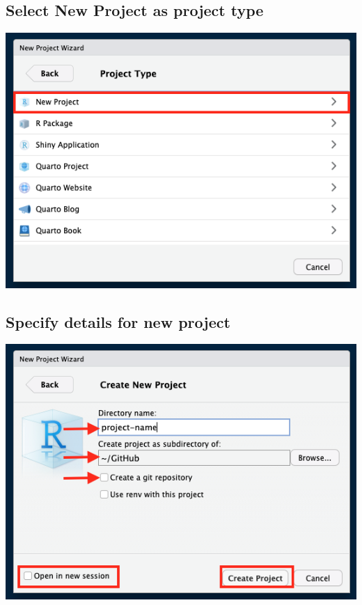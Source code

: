 \documentclass[
  12pt,
]{book}
\begin{document}
\hypertarget{select-new-project-as-project-type}{%
\subsection{\texorpdfstring{Select \textbf{New Project} as project type}{Select New Project as project type}}\label{select-new-project-as-project-type}}

\includegraphics{images/new_project4.png}

\hypertarget{specify-details-for-new-project}{%
\subsection{Specify details for new project}\label{specify-details-for-new-project}}

\includegraphics{images/new_project5.png}
\end{document}
